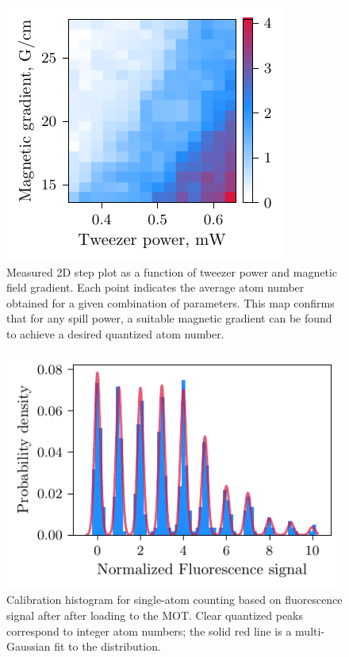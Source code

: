 
\begin{figure}[h]
    \centering
    \includegraphics{fig-py/step-plot-2d.pdf}
    \caption{
        Measured 2D step plot as a function of tweezer power and magnetic field gradient. Each point indicates the average atom number obtained for a given combination of parameters. This map confirms that for any spill power, a suitable magnetic gradient can be found to achieve a desired quantized atom number.
    }
    \label{fig:spillingadd-2d}
\end{figure}



\begin{figure}
    \centering
    \includegraphics{fig-py/atom-counting.pdf}
    \caption{
        Calibration histogram for single-atom counting based on fluorescence signal after after loading to the MOT. Clear quantized peaks correspond to integer atom numbers; the solid red line is a multi-Gaussian fit to the distribution. 
    }
    \label{fig:spillingadd}
\end{figure}



